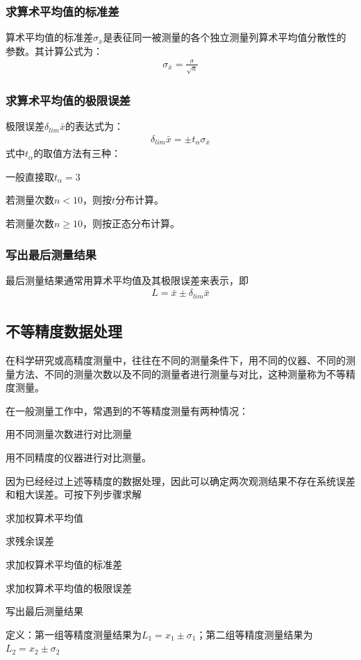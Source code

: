 \documentclass{ctexart}
\begin{document}
			\subsubsection{求算术平均值的标准差}
				算术平均值的标准差$\sigma_{\bar{x}}$是表征同一被测量的各个独立测量列算术平均值分散性的参数。其计算公式为：
				\begin{gather*}
					\sigma_{\bar{x}}=\frac{\sigma}{\sqrt{n}}
				\end{gather*}
			\subsubsection{求算术平均值的极限误差}
				极限误差$\delta_{lim} \bar{x}$的表达式为：
				\begin{gather*}
					\delta_{lim} \bar{x}= \pm t_\alpha \sigma_{\bar{x}}
				\end{gather*}
				式中$t_\alpha$的取值方法有三种：
				\begin{compactenum}
					\item 一般直接取$t_\alpha=3$
					\item 若测量次数$n<10$，则按$t$分布计算。
					\item 若测量次数$n\geq 10$，则按正态分布计算。
				\end{compactenum}
			\subsubsection{写出最后测量结果}
				最后测量结果通常用算术平均值及其极限误差来表示，即
				\begin{gather*}
					L=\bar{x} \pm 	\delta_{lim} \bar{x}
				\end{gather*}
		\subsection{不等精度数据处理}
			在科学研究或高精度测量中，往往在不同的测量条件下，用不同的仪器、不同的测量方法、不同的测量次数以及不同的测量者进行测量与对比，这种测量称为不等精度测量。\par
			在一般测量工作中，常遇到的不等精度测量有两种情况：
			\begin{inparaenum}
				\item 用不同测量次数进行对比测量
				\item 用不同精度的仪器进行对比测量。
			\end{inparaenum}
			因为已经经过上述等精度的数据处理，因此可以确定两次观测结果不存在系统误差和粗大误差。可按下列步骤求解
			\begin{compactenum}
				\item 求加权算术平均值
				\item 求残余误差
				\item 求加权算术平均值的标准差
				\item 求加权算术平均值的极限误差
				\item 写出最后测量结果
			\end{compactenum}
			定义：第一组等精度测量结果为$L_1=x_1 \pm \sigma_1$；第二组等精度测量结果为$L_2=x_2 \pm \sigma_2$
\end{document}
